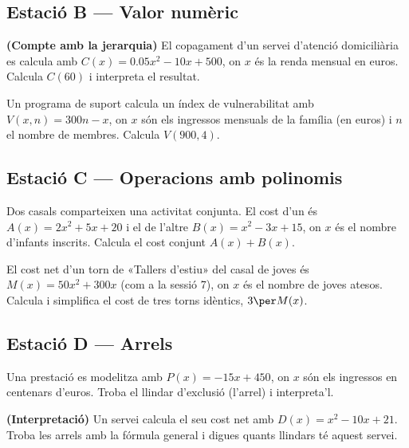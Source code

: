 \subsection*{Estació B — Valor numèric}

\begin{exercicis}
\begin{exlist}[start=3]
  \item \textbf{(Compte amb la jerarquia)} El copagament d'un servei
        d'atenció domiciliària es calcula amb
        $C(x)=\num{0,05}x^2-10x+500$, on $x$ és la renda mensual en
        euros. Calcula $C(60)$ i interpreta el resultat.

  \item Un programa de suport calcula un índex de vulnerabilitat amb
        $V(x,n)=300n-x$, on $x$ són els ingressos mensuals de la
        família (en euros) i $n$ el nombre de membres. Calcula
        $V(900,4)$.
\end{exlist}
\end{exercicis}

\subsection*{Estació C — Operacions amb polinomis}

\begin{exercicis}
\begin{exlist}[start=5]
  \item Dos casals comparteixen una activitat conjunta. El cost d'un és
        $A(x)=2x^2+5x+20$ i el de l'altre $B(x)=x^2-3x+15$, on $x$ és el
        nombre d'infants inscrits. Calcula el cost conjunt $A(x)+B(x)$.

  \item El cost net d'un torn de «Tallers d'estiu» del casal de joves
        és $M(x)=50x^2+300x$ (com a la sessió 7), on $x$ és el nombre de
        joves atesos. Calcula i simplifica el cost de tres torns
        idèntics, $3\per M(x)$.
\end{exlist}
\end{exercicis}

\subsection*{Estació D — Arrels}

\begin{exercicis}
\begin{exlist}[start=7]
  \item Una prestació es modelitza amb $P(x)=-15x+450$, on $x$ són els
        ingressos en centenars d'euros. Troba el llindar d'exclusió
        (l'arrel) i interpreta'l.

  \item \textbf{(Interpretació)} Un servei calcula el seu cost net amb
        $D(x)=x^2-10x+21$. Troba les arrels amb la fórmula general i
        digues quants llindars té aquest servei.
\end{exlist}
\end{exercicis}

